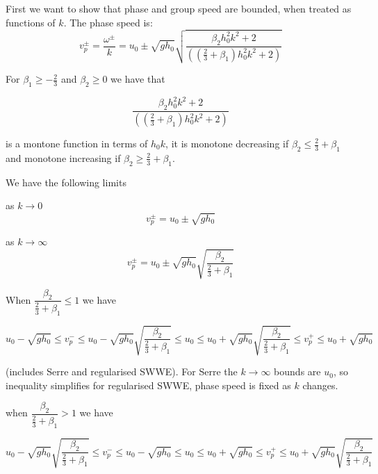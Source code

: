\documentclass[10pt]{article}
\begin{document}
First we want to show that phase and group speed are bounded, when treated as functions of $k$.
The phase speed is:
\begin{equation}
v^\pm_p = \frac{\omega^\pm}{k}=u_0 \pm  \sqrt{gh_0} \sqrt{\dfrac{\beta_2 h_0^2 k^2 + 2}{\left( \left(\frac{2}{3} + \beta_1\right) h_0^2 k^2 + 2\right)} }
\end{equation} 

For $\beta_1 \ge -\frac{2}{3}$ and $\beta_2 \ge 0$ we have that 

\begin{equation}
\dfrac{\beta_2 h_0^2 k^2 + 2}{\left( \left(\frac{2}{3} + \beta_1\right) h_0^2 k^2 + 2\right)}
\end{equation}

is a montone function in terms of $h_0k$, it is monotone decreasing if $\beta_2 \le \frac{2}{3} + \beta_1$ and monotone increasing if $\beta_2 \ge \frac{2}{3} + \beta_1$.
 
We have the following limits

as $k \rightarrow 0$
\begin{equation}
 v^\pm_p = u_0 \pm \sqrt{gh_0}
\end{equation} 

as $k \rightarrow \infty$
\begin{equation}
v^\pm_p = u_0 \pm \sqrt{gh_0} \sqrt{\dfrac{\beta_2}{\frac{2}{3} + \beta_1}}
\end{equation}

When $\dfrac{\beta_2}{\frac{2}{3} + \beta_1} \le 1$ we have

\begin{equation}
u_0 -  \sqrt{gh_0} \le  v^-_p \le u_0 - \sqrt{gh_0} \sqrt{\dfrac{\beta_2}{\frac{2}{3} + \beta_1}} \le u_0 \le u_0 + \sqrt{gh_0} \sqrt{\dfrac{\beta_2}{\frac{2}{3} + \beta_1}} \le   v^+_p  \le u_0 +   \sqrt{gh_0}
\end{equation}

(includes Serre and regularised SWWE). For Serre the $k \rightarrow \infty $ bounds are $u_0$, so inequality simplifies for regularised SWWE, phase speed is fixed as $k$ changes. 

when $\dfrac{\beta_2}{\frac{2}{3} + \beta_1} > 1$ we have

\begin{equation}
u_0 - \sqrt{gh_0} \sqrt{\dfrac{\beta_2}{\frac{2}{3} + \beta_1}} \le v^-_p \le u_0 -  \sqrt{gh_0} \le  u_0 \le u_0 + \sqrt{gh_0} \le   v^+_p  \le u_0 +  \sqrt{gh_0} \sqrt{\dfrac{\beta_2}{\frac{2}{3} + \beta_1}}
\end{equation}
\end{document}
